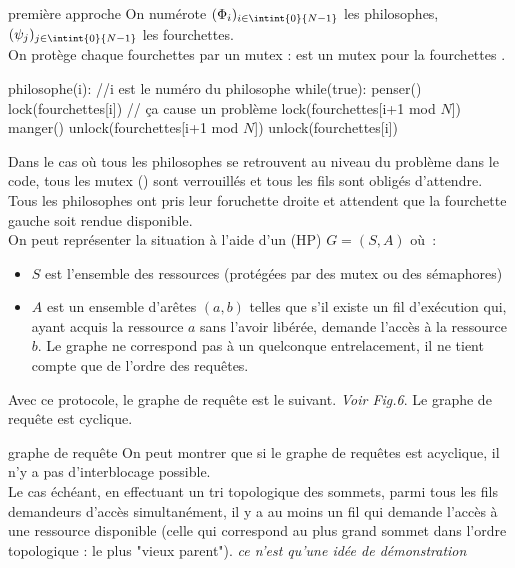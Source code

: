 \begin{adjustwidth}{-3cm}{-3cm}
\begin{implementation}{première approche}
    On numérote $(\Phi_i)_{i \in \intint{0}{N-1}}$ les philosophes, $(\psi_j)_{j \in \intint{0}{N-1}}$ les fourchettes.\\
    On protège chaque fourchettes par un mutex :  est un mutex pour la fourchettes .
    \begin{lstLNat}
    philosophe(i): //i est le numéro du philosophe
        while(true):
            penser()
            lock(fourchettes[i]) // ça cause un problème
            lock(fourchettes[i+1 mod $N$])
            manger()
            unlock(fourchettes[i+1 mod $N$])
            unlock(fourchettes[i])
    \end{lstLNat}
\end{implementation}
Dans le cas où tous les philosophes se retrouvent au niveau du problème dans le code, tous les mutex () sont verrouillés et tous les fils sont obligés d'attendre.\\
Tous les philosophes ont pris leur foruchette droite et attendent que la fourchette gauche soit rendue disponible.\\
On peut représenter la situation à l'aide d'un  (HP) $G = (S,A)$ où~:
\begin{itemize}
    \item $S$ est l'ensemble des ressources (protégées par des mutex ou des sémaphores)
    \item $A$ est un ensemble d'arêtes $(a,b)$ telles que s'il existe un fil d'exécution qui, ayant acquis la ressource $a$ sans l'avoir libérée, demande l'accès à la ressource $b$.
    Le graphe ne correspond pas à un quelconque entrelacement, il ne tient compte que de l'ordre des requêtes.
\end{itemize}
Avec ce protocole, le graphe de requête est le suivant. \textit{Voir Fig.6}. Le graphe de requête est cyclique.

\begin{remarque}{}{graphe de requête}
    On peut montrer que si le graphe de requêtes est acyclique, il n'y a pas d'interblocage possible.\\
    Le cas échéant, en effectuant un tri topologique des sommets, parmi tous les fils demandeurs d'accès simultanément, il y a au moins un fil qui demande l'accès à une ressource disponible (celle qui correspond au plus grand sommet dans l'ordre topologique : le plus "vieux parent"). \textit{ce n'est qu'une idée de démonstration}
\end{remarque}


\end{adjustwidth}
